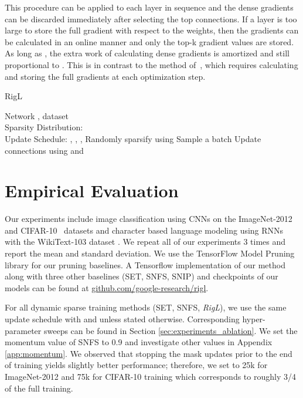 \documentclass{article}
\begin{document}
This procedure can be applied to each layer in sequence and the dense gradients can be discarded immediately after selecting the top connections.  If a layer is too large to store the full gradient with respect to the weights, then the gradients can be calculated in an online manner and only the top-k gradient values are stored. As long as , the extra work of calculating dense gradients is amortized and still proportional to . This is in contrast to the method of~\cite{dettmers2019}, which requires calculating and storing the full gradients at each optimization step.
\begin{algorithm}[h]
\caption{RigL}
\label{alg:rigl}
\begin{algorithmic}
  Network , dataset  \\
 \qquad\quad Sparsity Distribution:  \\
 \qquad\quad Update Schedule: , , , 
 \STATE  Randomly sparsify  using 
    \STATE Sample a batch 
    \STATE 
            \STATE 
            \STATE 
            \STATE 
            \STATE  Update connections  using  and 
        \ENDFOR
    \ELSE
        \STATE 
    \ENDIF
 \ENDFOR
\end{algorithmic}
\end{algorithm}




\section{Empirical Evaluation}
\label{sec:experiments}

Our experiments include image classification using CNNs on the ImageNet-2012~\citep{imagenet} and CIFAR-10~\citep{cifar10} datasets and character based language modeling using RNNs with the WikiText-103 dataset \citep{wikitext103}. We repeat all of our experiments 3 times and report the mean and standard deviation. We use the TensorFlow Model Pruning library \citep{gupta2018} for our pruning baselines. A Tensorflow \citep{tensorflow2015} implementation of our method along with three other baselines (SET, SNFS, SNIP) and checkpoints of our models can be found at \href{https://github.com/google-research/rigl}{github.com/google-research/rigl}.

For all dynamic sparse training methods (SET, SNFS, \textit{RigL}), we use the same update schedule with  and  unless stated otherwise. Corresponding hyper-parameter sweeps can be found in Section \ref{sec:experiments_ablation}. We set the momentum value of SNFS to 0.9 and investigate other values in Appendix \ref{app:momentum}. We observed that stopping the mask updates prior to the end of training yields slightly better performance; therefore, we set  to 25k for ImageNet-2012 and 75k for CIFAR-10 training which corresponds to roughly 3/4 of the full training.
\end{document}
